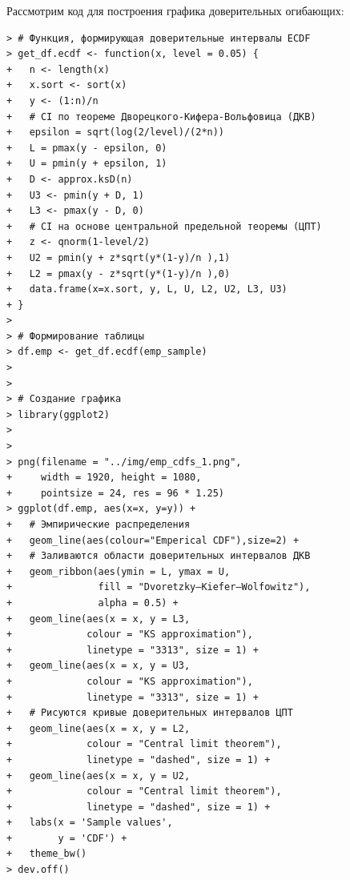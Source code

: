 \documentclass[14pt,a4paper]{scrartcl}
\begin{document}
Рассмотрим код для построения графика доверительных огибающих:
\begin{verbatim}
> # Функция, формирующая доверительные интервалы ECDF
> get_df.ecdf <- function(x, level = 0.05) {
+   n <- length(x)
+   x.sort <- sort(x)
+   y <- (1:n)/n 
+   # CI по теореме Дворецкого-Кифера-Вольфовица (ДКВ)
+   epsilon = sqrt(log(2/level)/(2*n))
+   L = pmax(y - epsilon, 0)
+   U = pmin(y + epsilon, 1)
+   D <- approx.ksD(n)
+   U3 <- pmin(y + D, 1)
+   L3 <- pmax(y - D, 0)
+   # CI на основе центральной предельной теоремы (ЦПТ)
+   z <- qnorm(1-level/2)
+   U2 = pmin(y + z*sqrt(y*(1-y)/n ),1)
+   L2 = pmax(y - z*sqrt(y*(1-y)/n ),0)
+   data.frame(x=x.sort, y, L, U, L2, U2, L3, U3) 
+ }
> 
> # Формирование таблицы
> df.emp <- get_df.ecdf(emp_sample)
> 
> 
> # Создание графика
> library(ggplot2)
> 
> 
> png(filename = "../img/emp_cdfs_1.png", 
+     width = 1920, height = 1080,
+     pointsize = 24, res = 96 * 1.25)
> ggplot(df.emp, aes(x=x, y=y)) + 
+   # Эмпирические распределения
+   geom_line(aes(colour="Emperical CDF"),size=2) + 
+   # Заливаются области доверительных интервалов ДКВ
+   geom_ribbon(aes(ymin = L, ymax = U, 
+               fill = "Dvoretzky–Kiefer–Wolfowitz"), 
+               alpha = 0.5) + 
+   geom_line(aes(x = x, y = L3, 
+             colour = "KS approximation"), 
+             linetype = "3313", size = 1) +
+   geom_line(aes(x = x, y = U3, 
+             colour = "KS approximation"), 
+             linetype = "3313", size = 1) +
+   # Рисуются кривые доверительных интервалов ЦПТ
+   geom_line(aes(x = x, y = L2, 
+             colour = "Central limit theorem"), 
+             linetype = "dashed", size = 1) +
+   geom_line(aes(x = x, y = U2, 
+             colour = "Central limit theorem"), 
+             linetype = "dashed", size = 1) +
+   labs(x = 'Sample values',
+        y = 'CDF') +
+   theme_bw()
> dev.off()
\end{verbatim}

\begin{figure}[h]
\end{figure}
\end{document}
